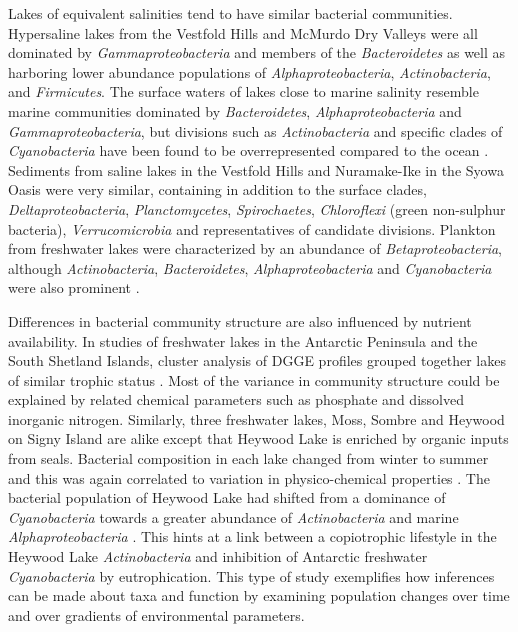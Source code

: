 Lakes of equivalent salinities tend to have similar bacterial communities.
Hypersaline lakes from the Vestfold Hills \cite{Bowman2000b} and McMurdo Dry Valleys \cite{Glatz2006, Mosier2007} were all dominated by \emph{Gammaproteobacteria} and members of the \emph{Bacteroidetes}
 as well as harboring lower abundance populations of \emph{Alphaproteobacteria}, \emph{Actinobacteria}, and \emph{Firmicutes}.
The surface waters of lakes close to marine salinity resemble marine communities dominated by \emph{Bacteroidetes}, \emph{Alphaproteobacteria} and \emph{Gammaproteobacteria},
 but divisions such as \emph{Actinobacteria} and specific clades of \emph{Cyanobacteria} have been found to be overrepresented compared to the ocean \cite{Lauro2011}.
Sediments from saline lakes in the Vestfold Hills \cite{Bowman2000a} and Nuramake-Ike in the Syowa Oasis \cite{Kurosawa2010} were very similar, 
containing in addition to the surface clades, \emph{Deltaproteobacteria}, \emph{Planctomycetes}, \emph{Spirochaetes}, \emph{Chloroflexi} (green non-sulphur bacteria), \emph{Verrucomicrobia} and representatives of candidate divisions.
Plankton from freshwater lakes were characterized by an abundance of \emph{Betaproteobacteria}, although \emph{Actinobacteria}, \emph{Bacteroidetes}, \emph{Alphaproteobacteria} and \emph{Cyanobacteria} were also prominent \cite{Pearce2003a, Pearce2005a, Pearce2005b, Schiaffino2009}. 


Differences in bacterial community structure are also influenced by nutrient availability.
In studies of freshwater lakes in the Antarctic Peninsula and the South Shetland Islands, cluster analysis of \ac{DGGE} profiles grouped together lakes of similar trophic status 
\cite{Schiaffino2009, Villaescusa2010}.
Most of the variance in community structure could be explained by related chemical parameters such as phosphate and dissolved inorganic nitrogen.
Similarly, three freshwater lakes, Moss, Sombre and Heywood on Signy Island are alike except that Heywood Lake is enriched by organic inputs from seals.
Bacterial composition in each lake changed from winter to summer and this was again correlated to variation in physico-chemical properties \cite{Pearce2005a}. 
The bacterial population of Heywood Lake had shifted from a dominance of \emph{Cyanobacteria} towards a greater abundance of \emph{Actinobacteria} and marine \emph{Alphaproteobacteria} \cite{Pearce2005b}.
This hints at a link between a copiotrophic lifestyle in the Heywood Lake \emph{Actinobacteria} and inhibition of Antarctic freshwater \emph{Cyanobacteria} by eutrophication. 
This type of study exemplifies how inferences can be made about taxa and function by examining population changes over time and over gradients of environmental parameters.


